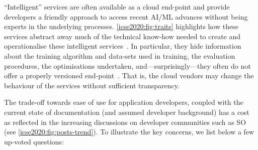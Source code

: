 ``Intelligent'' services are often available as a cloud end-point and provide developers a friendly approach to access recent AI/ML advances without being experts in the underlying processes. \cref{icse2020:fig:traits} highlights how these services abstract away much of the technical know-how needed to create and operationalise these intelligent services~\citep{Ortiz:2017wg}. In particular, they hide information about the training algorithm and data-sets used in training, the evaluation procedures, the optimisations undertaken, and---surprisingly---they often do not offer a properly versioned end-point~\citep{Cummaudo:2019va, Ohtake:2019vi}. That is, the cloud vendors may change the behaviour of the services without sufficient transparency.

The trade-off towards ease of use for application developers, coupled with the current state of documentation (and assumed developer background) has a cost as reflected in the increasing discussions on developer communities such as SO (see \cref{icse2020:fig:posts-trend}). To illustrate the key concerns, we list below a few up-voted questions:

